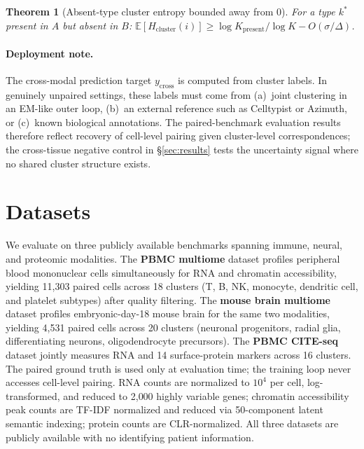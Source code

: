 \documentclass[pmlr]{jmlr}
\newtheorem{mainthm}{Theorem}
\newcommand{\Hcluster}{H_{\text{cluster}}}
\begin{document}
\begin{mainthm}[Absent-type cluster entropy bounded away from 0]
\label{thm:absent}
For a type $k^*$ present in $A$ but absent in $B$: $\mathbb{E}[\Hcluster(i)] \geq \log K_{\text{present}} / \log K - O(\sigma/\Delta)$.
\end{mainthm}

\paragraph{Deployment note.} The cross-modal prediction target $y_{\text{cross}}$ is computed from cluster labels. In genuinely unpaired settings, these labels must come from (a)~joint clustering in an EM-like outer loop, (b)~an external reference such as Celltypist or Azimuth, or (c)~known biological annotations. The paired-benchmark evaluation results therefore reflect recovery of cell-level pairing given cluster-level correspondences; the cross-tissue negative control in \S\ref{sec:results} tests the uncertainty signal where no shared cluster structure exists.

\section{Datasets}
\label{sec:cohort}

We evaluate on three publicly available benchmarks spanning immune, neural, and proteomic modalities. The \textbf{PBMC multiome} dataset profiles peripheral blood mononuclear cells simultaneously for RNA and chromatin accessibility, yielding 11{,}303 paired cells across 18 clusters (T, B, NK, monocyte, dendritic cell, and platelet subtypes) after quality filtering. The \textbf{mouse brain multiome} dataset profiles embryonic-day-18 mouse brain for the same two modalities, yielding 4{,}531 paired cells across 20 clusters (neuronal progenitors, radial glia, differentiating neurons, oligodendrocyte precursors). The \textbf{PBMC CITE-seq} dataset jointly measures RNA and 14 surface-protein markers across 16 clusters. The paired ground truth is used only at evaluation time; the training loop never accesses cell-level pairing. RNA counts are normalized to $10^4$ per cell, log-transformed, and reduced to 2{,}000 highly variable genes; chromatin accessibility peak counts are TF-IDF normalized and reduced via 50-component latent semantic indexing; protein counts are CLR-normalized. All three datasets are publicly available with no identifying patient information.
\end{document}
